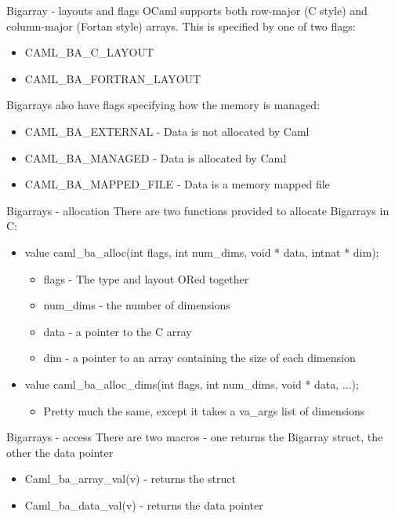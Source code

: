 \documentclass{beamer}
\begin{document}
\begin{frame}{Bigarray - layouts and flags}
OCaml supports both row-major (C style) and column-major (Fortan style) arrays.
This is specified by one of two flags:
\begin{itemize}
  \item CAML\_BA\_C\_LAYOUT
  \item CAML\_BA\_FORTRAN\_LAYOUT
\end{itemize}
Bigarrays also have flags specifying how the memory is managed:
\begin{itemize}
  \item CAML\_BA\_EXTERNAL - Data is not allocated by Caml
  \item CAML\_BA\_MANAGED - Data is allocated by Caml
  \item CAML\_BA\_MAPPED\_FILE - Data is a memory mapped file
\end{itemize}
\end{frame}

\begin{frame}{Bigarrays - allocation}
There are two functions provided to allocate Bigarrays in C:
\begin{itemize}
    \item value caml\_ba\_alloc(int flags, int num\_dims, void * data, intnat * dim);
    \begin{itemize}
        \item flags - The type and layout ORed together
        \item num\_dims - the number of dimensions
        \item data - a pointer to the C array
        \item dim - a pointer to an array containing the size of each dimension
    \end{itemize}
    \item value caml\_ba\_alloc\_dims(int flags, int num\_dims, void * data, ...);
    \begin{itemize}
        \item Pretty much the same, except it takes a va\_args list of dimensions
    \end{itemize}
\end{itemize}
\end{frame}

\begin{frame}{Bigarrays - access}
There are two macros - one returns the Bigarray struct, the other the data pointer
\begin{itemize}
    \item Caml\_ba\_array\_val(v) - returns the struct
    \item Caml\_ba\_data\_val(v) - returns the data pointer
\end{itemize}
\end{frame}
\end{document}
